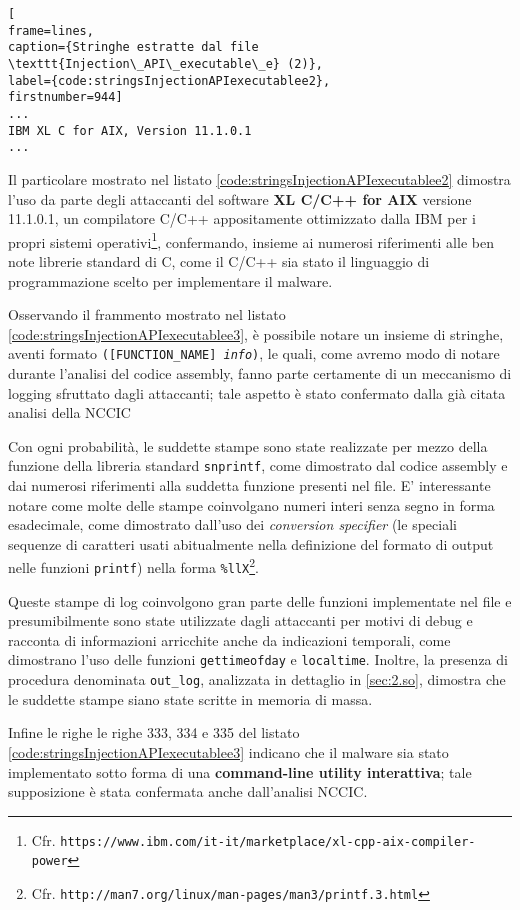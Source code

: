\documentclass[10pt,a4paper, titlepage]{report}
\begin{document}
\begin{lstlisting}[
frame=lines, 
caption={Stringhe estratte dal file \texttt{Injection\_API\_executable\_e} (2)}, 
label={code:stringsInjectionAPIexecutablee2},
firstnumber=944]
...
IBM XL C for AIX, Version 11.1.0.1
...
\end{lstlisting}

Il particolare mostrato nel listato \ref{code:stringsInjectionAPIexecutablee2} dimostra l'uso da parte degli attaccanti del software \textbf{XL C/C++ for AIX} versione 11.1.0.1, un compilatore C/C++ appositamente ottimizzato dalla IBM per i propri sistemi operativi\footnote{Cfr. \texttt{https://www.ibm.com/it-it/marketplace/xl-cpp-aix-compiler-power}}, confermando, insieme ai numerosi riferimenti alle ben note librerie standard di C, come il C/C++ sia stato il linguaggio di programmazione scelto per implementare il malware.

Osservando il frammento mostrato nel listato \ref{code:stringsInjectionAPIexecutablee3}, è possibile notare un insieme di stringhe, aventi formato \texttt{([FUNCTION\_NAME] \textit{info})}, le quali, come avremo modo di notare durante l'analisi del codice assembly, fanno parte certamente di un meccanismo di logging sfruttato dagli attaccanti; tale aspetto è stato confermato dalla già citata analisi della NCCIC

Con ogni probabilità, le suddette stampe sono state realizzate per mezzo della funzione della libreria standard \texttt{snprintf}, come dimostrato dal codice assembly e dai numerosi riferimenti alla suddetta funzione presenti nel file. E' interessante notare come molte delle stampe coinvolgano numeri interi senza segno in forma esadecimale, come dimostrato dall'uso dei \textit{conversion specifier} (le speciali sequenze di caratteri usati abitualmente nella definizione del formato di output nelle funzioni \texttt{printf}) nella forma \texttt{\%llX}\footnote{Cfr. \texttt{http://man7.org/linux/man-pages/man3/printf.3.html}}.

Queste stampe di log coinvolgono gran parte delle funzioni implementate nel file e presumibilmente sono state utilizzate dagli attaccanti per motivi di debug e racconta di informazioni arricchite anche da indicazioni temporali, come dimostrano l'uso delle funzioni \texttt{gettimeofday} e \texttt{localtime}. Inoltre, la presenza di procedura denominata \texttt{out\_log}, analizzata in dettaglio in \ref{sec:2.so}, dimostra che le suddette stampe siano state scritte in memoria di massa.

Infine le righe le righe 333, 334 e 335 del listato \ref{code:stringsInjectionAPIexecutablee3} indicano che il malware sia stato implementato sotto forma di una \textbf{command-line utility interattiva}; tale supposizione è stata confermata anche dall'analisi NCCIC.
\end{document}
